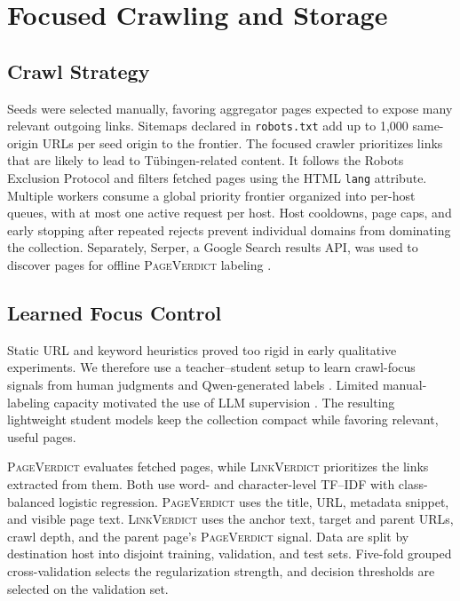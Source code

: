 \documentclass{article}
\begin{document}
\section{Focused Crawling and Storage}
\subsection{Crawl Strategy}
Seeds were selected manually, favoring aggregator pages expected to expose
many relevant outgoing links. Sitemaps declared in \texttt{robots.txt} add up
to 1,000 same-origin URLs per seed origin to the frontier. The focused crawler
prioritizes links that are likely to lead to Tübingen-related content. It
follows the Robots Exclusion Protocol \citep{rfc9309} and filters fetched pages
using the HTML \texttt{lang} attribute. Multiple
workers consume a global priority frontier organized into per-host queues,
with at most one active request per host. Host cooldowns, page caps, and early
stopping after repeated rejects prevent individual domains from dominating the
collection.
Separately, Serper, a Google Search results API, was used to discover pages
for offline \textsc{PageVerdict} labeling \citep{serper}.

\subsection{Learned Focus Control}
Static URL and keyword heuristics proved too rigid in early qualitative
experiments. We therefore use a teacher--student setup to learn crawl-focus
signals from human judgments and Qwen-generated labels \citep{qwen25}. Limited
manual-labeling capacity motivated the use of LLM supervision \citep{wang2021}.
The resulting lightweight student models keep the collection compact while
favoring relevant, useful pages.

\textsc{PageVerdict} evaluates fetched pages, while \textsc{LinkVerdict}
prioritizes the links extracted from them. Both use word- and character-level
TF--IDF with class-balanced logistic regression. \textsc{PageVerdict} uses the
title, URL, metadata snippet, and visible page text. \textsc{LinkVerdict} uses
the anchor text, target and parent URLs, crawl depth, and the parent page's
\textsc{PageVerdict} signal. Data are split by destination host into disjoint
training, validation, and test sets. Five-fold grouped cross-validation selects
the regularization strength, and decision thresholds are selected on the
validation set.
\end{document}
